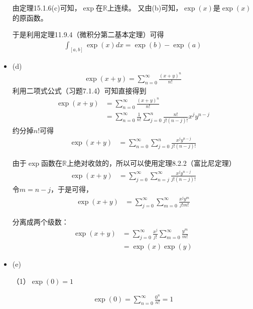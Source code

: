 \documentclass{article}
\begin{document}
\begin{itemize}
        由定理15.1.6(c)可知，$\exp$在$\mathbb{R}$上连续。
        又由(b)可知，$\exp(x)$是$\exp(x)$的原函数。

        于是利用定理11.9.4（微积分第二基本定理）可得
        \begin{align*}
          \int_{[a, b]} \exp(x) dx = \exp(b) - \exp(a)
        \end{align*}


  \item (d)
        \begin{align*}
          \exp(x + y) = \sum\limits_{n = 0}^\infty \frac{(x + y)^n}{n!}
        \end{align*}
        利用二项式公式（习题7.1.4）可知直接得到
        \begin{align*}
          \exp(x + y)
           & =\sum\limits_{n = 0}^\infty \frac{(x + y)^n}{n!}                                                  \\
           & = \sum\limits_{n = 0}^\infty \frac{1}{n!}\sum \limits_{j = 0}^n \frac{n!}{j!(n - j)!}x^jy^{n - j}
        \end{align*}
        约分掉$n!$可得
        \begin{align*}
          \exp(x + y)
           & = \sum\limits_{n = 0}^\infty \sum \limits_{j = 0}^n \frac{x^jy^{n - j}}{j!(n - j)!}
        \end{align*}

        由于$\exp$函数在$\mathbb{R}$上绝对收敛的，所以可以使用定理8.2.2（富比尼定理）
        \begin{align*}
          \exp(x + y)
           & = \sum\limits_{j = 0}^\infty \sum \limits_{n = j}^\infty \frac{x^jy^{n - j}}{j!(n - j)!}
        \end{align*}
        令$m = n - j$，于是可得，
        \begin{align*}
          \exp(x + y)
           & = \sum\limits_{j = 0}^\infty \sum \limits_{m = 0}^\infty \frac{x^jy^m}{j!m!}
        \end{align*}

        分离成两个级数：
        \begin{align*}
          \exp(x + y)
           & = \sum\limits_{j = 0}^\infty \frac{x^j}{j!} \sum \limits_{m = 0}^\infty \frac{y^m}{m!} \\
           & = \exp(x) \exp(y)
        \end{align*}
  \item (e)

        （1）$\exp(0) = 1$

        \begin{align*}
          \exp(0) = \sum\limits_{n = 0}^\infty \frac{0^n}{n!} = 1
        \end{align*}


\end{itemize}
\end{document}
